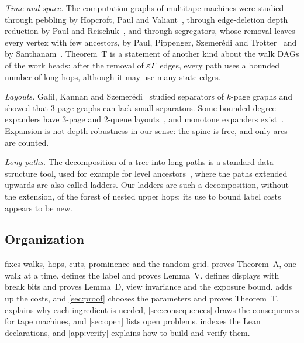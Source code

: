 \emph{Time and space.} The computation graphs of multitape machines were studied through pebbling by Hopcroft, Paul and
Valiant~\cite{HPV1977}, through edge-deletion depth reduction by Paul and Reischuk~\cite{PaulReischuk1980}, and through
segregators, whose removal leaves every vertex with few ancestors, by Paul, Pippenger, Szemer\'edi and Trotter~\cite{PPST1983}
and by Santhanam~\cite{Santhanam2001}. Theorem~T is a statement of another kind about the walk DAGs of the work heads: after
the removal of $\varepsilon T$ edges, every path uses a bounded number of long hops, although it may use many state edges.

\emph{Layouts.} Galil, Kannan and Szemer\'edi~\cite{GKS1989separators,GKS1989pushdown} studied separators of $k$-page graphs
and showed that $3$-page graphs can lack small separators. Some bounded-degree expanders have $3$-page and $2$-queue
layouts~\cite{DSW2016}, and monotone expanders exist~\cite{DvirWigderson2010,BourgainYehudayoff2013}. Expansion is not
depth-robustness in our sense: the spine is free, and only arcs are counted.

\emph{Long paths.} The decomposition of a tree into long paths is a standard data-structure tool, used for example for level
ancestors~\cite{BenderFarachColton2004}, where the paths extended upwards are also called ladders. Our ladders are such a
decomposition, without the extension, of the forest of nested upper hops; its use to bound label costs appears to be new.

\subsection{Organization}

 fixes walks, hops, cuts, prominence and the random grid.  proves Theorem~A, one walk at a
time.  defines the label and proves Lemma~V.  defines displays with break bits and proves
Lemma~D, view invariance and the exposure bound.  adds up the costs, and \cref{sec:proof} chooses the
parameters and proves Theorem~T.  explains why each ingredient is needed, \cref{sec:consequences} draws the
consequences for tape machines, and \cref{sec:open} lists open problems.  indexes the Lean declarations, and
\cref{app:verify} explains how to build and verify them.

